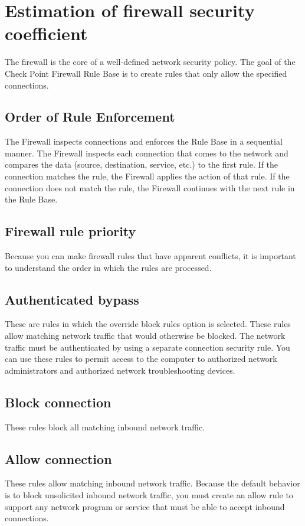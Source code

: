 \documentclass[conference]{IEEEtran}
\begin{document}
\section{Estimation of firewall security coefficient}
The firewall is the core of a well-defined network security policy. The goal of the Check Point Firewall Rule Base is to create rules that only allow the specified connections.
\subsection{Order of Rule Enforcement}
The Firewall inspects connections and enforces the Rule Base in a sequential manner. The Firewall inspects each connection that comes to the network and compares the data (source, destination, service, etc.) to the first rule. If the connection matches the rule, the Firewall applies the action of that rule. If the connection does not match the rule, the Firewall continues with the next rule in the Rule Base.
\subsection{Firewall rule priority}
Because you can make firewall rules that have apparent conflicts, it is important to understand the order in which the rules are processed.
\subsection{Authenticated bypass}
These are rules in which the override block rules option is selected. These rules allow matching network traffic that would otherwise be blocked. The network traffic must be authenticated by using a separate connection security rule. You can use these rules to permit access to the computer to authorized network administrators and authorized network troubleshooting devices.
\subsection{Block connection}
       These rules block all matching inbound network traffic.
\subsection{Allow connection}
These rules allow matching inbound network traffic. Because the default  behavior is to block unsolicited inbound network traffic, you must create an allow rule to support any network program or service that must be able to accept inbound connections.
\end{document}
